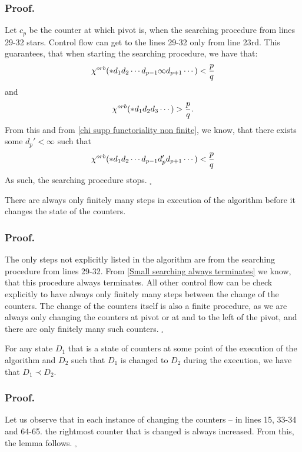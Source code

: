 \subsubsection{Proof.}
Let $c_p$ be the counter at which pivot is, when the searching procedure from lines 
29-32 stars. Control flow can get to the lines 29-32 only from line 23rd. This guarantees, that 
when starting the searching procedure, we have that:
\begin{equation}
{\chi^{orb}(*d_1d_2\cdots d_{p-1}\infty d_{p+1}\cdots)} < \frac{p}{q}
\end{equation}
and  
\begin{equation}
{\chi^{orb}(*d_1d_2d_3\cdots )} > \frac{p}{q}.
\end{equation}
From this and from \ref{chi supp functoriality non finite}, 
we know, that there exists some $d_p' < \infty$ such that 
\begin{equation}
{\chi^{orb}(*d_1d_2\cdots d_{p-1}d_p' d_{p+1}\cdots)} < \frac{p}{q}
\end{equation}
As such, the searching procedure stops. $_\square$
\begin{lemma}\label{finitely many steps between counter changes}
There are always only finitely many steps in execution of the algorithm before it 
changes the state of the counters. 
\end{lemma}
\subsubsection{Proof.}
The only steps not explicitly listed in the algorithm are from the searching procedure from lines 
29-32. From \ref{Small searching always terminates} we know, that this procedure 
always terminates. 
All other control flow can be check explicitly to have always only finitely many steps between 
the change of the counters. 
The change of the counters itself is also a finite procedure, as we are always only changing 
the counters at pivot or at and to the left of the pivot, and there are only finitely many 
such counters. $_\square$
\begin{lemma}\label{always increases}
For any state $D_1$ that is a state of counters at some point of the execution of the algorithm 
and $D_2$ such that $D_1$ is changed to $D_2$ during the execution, we have that $D_1 \prec D_2$.
\end{lemma}
\subsubsection{Proof.}
Let us observe that in each instance of changing the counters -- in lines 15, 33-34 and 64-65. 
the rightmost counter that is changed is always increased. From this, the lemma follows. 
$_\square$
